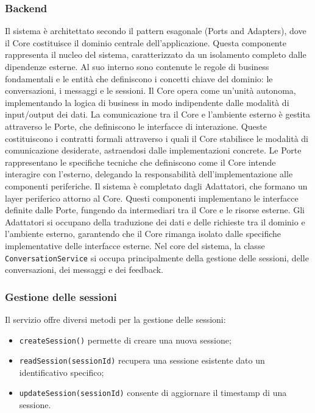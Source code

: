 \newpage
\subsubsection{Backend}
 Il sistema è architettato secondo il pattern esagonale (Ports and Adapters), dove il Core costituisce il dominio centrale dell'applicazione. Questa componente rappresenta il nucleo del sistema, caratterizzato da un isolamento completo dalle dipendenze esterne. Al suo interno sono contenute le regole di business fondamentali e le entità che definiscono i concetti chiave del dominio: le conversazioni, i messaggi e le sessioni. Il Core opera come un'unità autonoma, implementando la logica di business in modo indipendente dalle modalità di input/output dei dati.
\newline La comunicazione tra il Core e l'ambiente esterno è gestita attraverso le Porte, che definiscono le interfacce di interazione. Queste costituiscono i contratti formali attraverso i quali il Core stabilisce le modalità di comunicazione desiderate, astraendosi dalle implementazioni concrete. Le Porte rappresentano le specifiche tecniche che definiscono come il Core intende interagire con l'esterno, delegando la responsabilità dell'implementazione alle componenti periferiche.
\newline Il sistema è completato dagli Adattatori, che formano un layer periferico attorno al Core. Questi componenti implementano le interfacce definite dalle Porte, fungendo da intermediari tra il Core e le risorse esterne. Gli Adattatori si occupano della traduzione dei dati e delle richieste tra il dominio e l'ambiente esterno, garantendo che il Core rimanga isolato dalle specifiche implementative delle interfacce esterne.
Nel core del sistema, la classe \texttt{ConversationService} si occupa principalmente della gestione delle sessioni, delle conversazioni, dei messaggi e dei feedback.

\subsubsection*{Gestione delle sessioni}
Il servizio offre diversi metodi per la gestione delle sessioni:
\begin{itemize}
    \item \texttt{createSession()} permette di creare una nuova sessione;
    \item \texttt{readSession(sessionId)} recupera una sessione esistente dato un identificativo specifico;
    \item \texttt{updateSession(sessionId)} consente di aggiornare il timestamp di una sessione.
\end{itemize}


